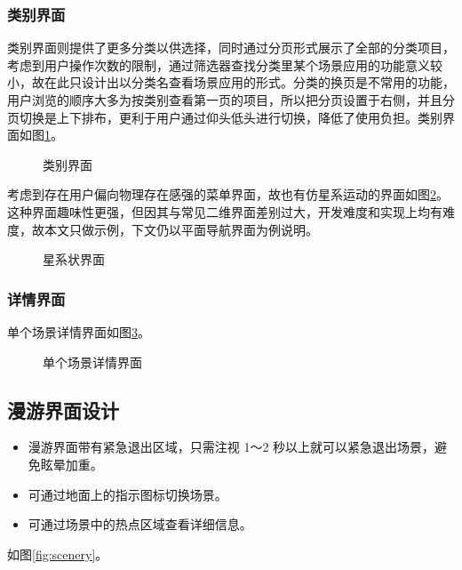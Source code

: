 \subsubsection{类别界面}
类别界面则提供了更多分类以供选择，同时通过分页形式展示了全部的分类项目，考虑到用户操作次数的限制，通过筛选器查找分类里某个场景应用的功能意义较小，故在此只设计出以分类名查看场景应用的形式。分类的换页是不常用的功能，用户浏览的顺序大多为按类别查看第一页的项目，所以把分页设置于右侧，并且分页切换是上下排布，更利于用户通过仰头低头进行切换，降低了使用负担。类别界面如图\ref{fig:d-06}。

\begin{figure}[htp]
\centering
{}
\caption{类别界面}
\label{fig:d-06}
\end{figure}

考虑到存在用户偏向物理存在感强的菜单界面，故也有仿星系运动的界面如图\ref{fig:d-02}。这种界面趣味性更强，但因其与常见二维界面差别过大，开发难度和实现上均有难度，故本文只做示例，下文仍以平面导航界面为例说明。

\begin{figure}[htp]
\centering
{}
\caption{星系状界面}
\label{fig:d-02}
\end{figure}

\subsubsection{详情界面}

单个场景详情界面如图\ref{fig:d-07}。

\begin{figure}[htp]
\centering
{}
\caption{单个场景详情界面}
\label{fig:d-07}
\end{figure}

\subsection{漫游界面设计}
\begin{itemize}
	\item 漫游界面带有紧急退出区域，只需注视 1～2 秒以上就可以紧急退出场景，避免眩晕加重。
	\item 可通过地面上的指示图标切换场景。
	\item 可通过场景中的热点区域查看详细信息。
\end{itemize}
如图\ref{fig:scenery}。

